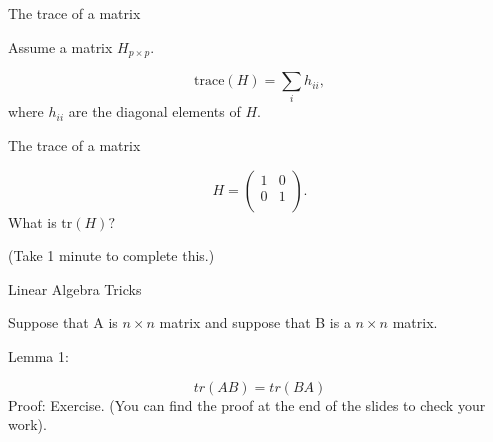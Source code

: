 \documentclass[
  ignorenonframetext,
]{beamer}
\providecommand{\tightlist}{%
  \setlength{\itemsep}{0pt}\setlength{\parskip}{0pt}}
\begin{document}

\begin{frame}{The trace of a matrix}
\protect\hypertarget{the-trace-of-a-matrix}{}

Assume a matrix \(H_{p \times p}.\)

\[\text{trace}(H) = \sum_i h_{ii},\] where \(h_{ii}\) are the diagonal
elements of \(H.\)

\end{frame}

\begin{frame}{The trace of a matrix}
\protect\hypertarget{the-trace-of-a-matrix-1}{}

\[
H =
\left( \begin{array}{cc}
1 & 0 \\
0 & 1 \\
\end{array} \right).
\] What is \(\text{tr}({H})?\)

\vline

(Take 1 minute to complete this.)

\end{frame}

\begin{frame}{Linear Algebra Tricks}
\protect\hypertarget{linear-algebra-tricks}{}

Suppose that A is \(n \times n\) matrix and suppose that B is a
\(n \times n\) matrix.

Lemma 1:

\[tr(AB) = tr(BA)\] Proof: Exercise. (You can find the proof at the end
of the slides to check your work).

\end{frame}
\end{document}
